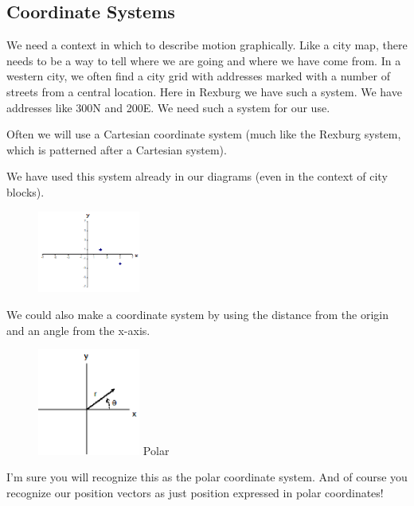 \documentclass[]{Book}
\begin{document}
\subsection{Coordinate Systems}

We need a context in which to describe motion graphically. Like a city map,
there needs to be a way to tell where we are going and where we have come
from. In a western city, we often find a city grid with addresses marked
with a number of streets from a central location. Here in Rexburg we have
such a system. We have addresses like 300N and 200E. We need such a system
for our use.

Often we will use a Cartesian coordinate system (much like the Rexburg
system, which is patterned after a Cartesian system).

We have used this system already in our diagrams (even in the context of
city blocks).

\begin{figure}[h!]
	\begin{center}
		\includegraphics[width=0.3\textwidth]{Coordinate_System_1}	
		\label{fig:Cartesian}
	\end{center}
\end{figure}
We could also make a coordinate system by using the distance from the origin
and an angle from the x-axis. 

\begin{figure}[h!]
	\begin{center}
		\includegraphics[width=0.3\textwidth]{Coordinate_System_Polar}	
		\label{fig:}Polar
	\end{center}
\end{figure}

I'm sure
you will recognize this as the polar coordinate system. And of course you
recognize our position vectors as just position expressed in polar
coordinates!
\end{document}
